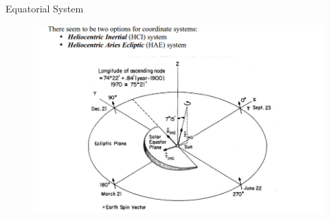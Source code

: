 \documentclass{beamer}
\begin{document}
\begin{frame}{Equatorial System}
\begin{figure}									
	\includegraphics[width=.9\textwidth]{Pics/HELIO_coordsystems.png}
\end{figure}
\end{frame}
\end{document}
